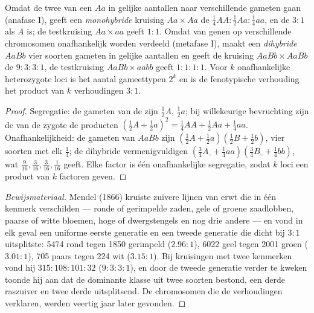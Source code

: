 \begin{theorem}\label{thm:b2:meiosis-heredity:mendel}
Omdat de twee  van een  $Aa$ in gelijke aantallen
naar verschillende gameten gaan (anafase I), geeft een \emph{monohybride}
kruising $Aa \times Aa$ de  $\tfrac14 AA : \tfrac12 Aa :
\tfrac14 aa$, en de  $3 : 1$ als $A$  is; de testkruising
$Aa \times aa$ geeft $1 : 1$. Omdat  van genen op verschillende
chromosomen onafhankelijk worden verdeeld (metafase I), maakt een
\emph{dihybride}
$AaBb$ vier soorten gameten in gelijke aantallen en geeft de kruising
$AaBb \times AaBb$ de  $9 : 3 : 3 : 1$, de testkruising
$AaBb \times aabb$ geeft $1 : 1 : 1 : 1$. Voor $k$ onafhankelijke
heterozygote loci is het aantal gameettypen $2^k$ en is de
fenotypische verhouding het product van $k$ verhoudingen $3 : 1$.
\end{theorem}
\begin{proof}
Segregatie: de gameten van de  zijn $\tfrac12 A$,
$\tfrac12 a$; bij willekeurige bevruchting zijn de  van de zygote de
producten $(\tfrac12 A + \tfrac12 a)^2 = \tfrac14 AA + \tfrac12 Aa +
\tfrac14 aa$. Onafhankelijkheid: de gameten van $AaBb$ zijn $(\tfrac12 A
+ \tfrac12 a)(\tfrac12 B + \tfrac12 b)$, vier soorten met elk $\tfrac14$;
de dihybride  vermenigvuldigen $(\tfrac34 A\_ + \tfrac14 aa)
(\tfrac34 B\_ + \tfrac14 bb)$, wat $\tfrac{9}{16}, \tfrac{3}{16},
\tfrac{3}{16}, \tfrac{1}{16}$ geeft. Elke factor is één onafhankelijke
segregatie, zodat $k$ loci een product van $k$ factoren geven.
\end{proof}
\begin{proof}[Bewijsmateriaal]
Mendel (1866) kruiste zuivere lijnen van erwt die in één kenmerk
verschilden --- ronde of gerimpelde zaden, gele of groene zaadlobben,
paarse of witte bloemen, hoge of dwergstengels en nog drie andere --- en
vond in elk geval een uniforme eerste generatie en een tweede generatie
die dicht bij $3 : 1$ uitsplitste: 5474 rond tegen 1850 gerimpeld ($2.96 :
1$), 6022 geel tegen 2001 groen ($3.01 : 1$), 705 paars tegen 224 wit
($3.15 : 1$). Bij kruisingen met twee kenmerken vond hij $315 : 108 : 101 :
32$ ($9 : 3 : 3 : 1$), en door de tweede generatie verder te kweken
toonde hij aan dat de dominante klasse uit twee soorten bestond, een derde
raszuiver en twee derde uitsplitsend. De chromosomen die de verhoudingen
verklaren, werden veertig jaar later gevonden.
\end{proof}

